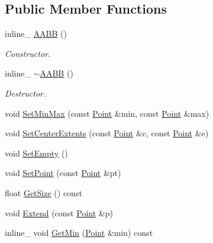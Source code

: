 \subsection*{Public Member Functions}
\begin{DoxyCompactItemize}
\item 
inline\+\_\+ \hyperlink{classOpcode_1_1AABB_af3a2bceac729e44344b8d695f2187805}{A\+A\+BB} ()\hypertarget{classOpcode_1_1AABB_af3a2bceac729e44344b8d695f2187805}{}\label{classOpcode_1_1AABB_af3a2bceac729e44344b8d695f2187805}

\begin{DoxyCompactList}\small\item\em Constructor. \end{DoxyCompactList}\item 
inline\+\_\+ \hyperlink{classOpcode_1_1AABB_af58c46252c82df4a6076e179bb6da790}{$\sim$\+A\+A\+BB} ()\hypertarget{classOpcode_1_1AABB_af58c46252c82df4a6076e179bb6da790}{}\label{classOpcode_1_1AABB_af58c46252c82df4a6076e179bb6da790}

\begin{DoxyCompactList}\small\item\em Destructor. \end{DoxyCompactList}\item 
void \hyperlink{classOpcode_1_1AABB_abf58854d4d784e23e61db12ff4d3b4ec}{Set\+Min\+Max} (const \hyperlink{classOpcode_1_1Point}{Point} \&min, const \hyperlink{classOpcode_1_1Point}{Point} \&max)
\item 
void \hyperlink{classOpcode_1_1AABB_a066f07ceb695a45b4a55313be175df37}{Set\+Center\+Extents} (const \hyperlink{classOpcode_1_1Point}{Point} \&c, const \hyperlink{classOpcode_1_1Point}{Point} \&e)
\item 
void \hyperlink{classOpcode_1_1AABB_a246e9552769168c552224f0d04ebecbb}{Set\+Empty} ()
\item 
void \hyperlink{classOpcode_1_1AABB_abae6b66247af798712b77e14020d9784}{Set\+Point} (const \hyperlink{classOpcode_1_1Point}{Point} \&pt)
\item 
float \hyperlink{classOpcode_1_1AABB_a4d218f6315aea4ff39465d00a90d64a5}{Get\+Size} () const 
\item 
void \hyperlink{classOpcode_1_1AABB_ae95fd015ce28e7daf0c805f6c9702cb4}{Extend} (const \hyperlink{classOpcode_1_1Point}{Point} \&p)
\item 
inline\+\_\+ void \hyperlink{classOpcode_1_1AABB_a0e44911edf58a8dea4f2552b3943faab}{Get\+Min} (\hyperlink{classOpcode_1_1Point}{Point} \&min) const \hypertarget{classOpcode_1_1AABB_a0e44911edf58a8dea4f2552b3943faab}{}\label{classOpcode_1_1AABB_a0e44911edf58a8dea4f2552b3943faab}


\end{DoxyCompactItemize}
